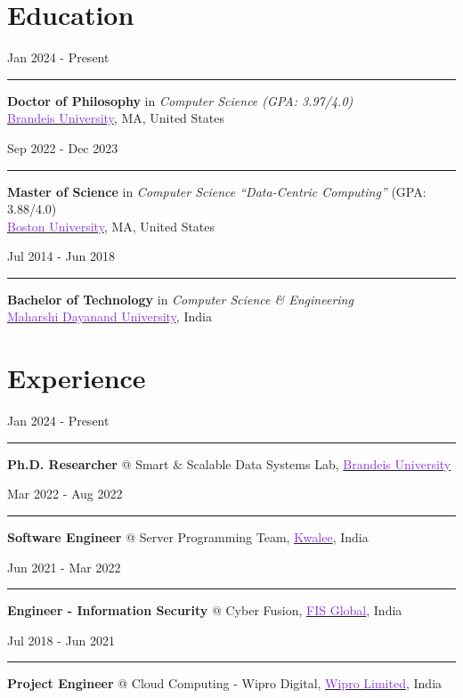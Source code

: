 \documentclass[11pt,a4paper,calibri]{moderncv}
\newcommand{\edu}[2]{
  \noindent
  \begin{minipage}[c]{0.18\textwidth} \hfill #1 \end{minipage}%
  \hspace{0.01\textwidth}
  \begin{minipage}[c]{0.02\textwidth} \textcolor{gray}{\rule{1pt}{0.8cm}} \end{minipage}%
  \begin{minipage}[c]{0.76\textwidth} \raggedright{#2} \end{minipage}%
}
\newcommand{\experience}[2]{
    \noindent
          \begin{minipage}[c]{0.185\textwidth} \begin{flushright} #1 \end{flushright} \end{minipage}%
          \hspace{0.01\textwidth}
          \begin{minipage}[c]{0.02\textwidth} \textcolor{gray}{\rule{1pt}{0.4cm}} \end{minipage}%
          \begin{minipage}[c]{0.755\textwidth} \raggedright{#2} \end{minipage}%
}
\begin{document}
\makecvtitle{}
\vspace{-48pt}

\section{Education}
\edu {Jan 2024 \-- Present}{
    \textbf{Doctor of Philosophy} in \textit{Computer Science (GPA: 3.97/4.0)}\\
    \href{https://www.brandeis.edu/}{\textcolor{blueviolet}{Brandeis University}}, MA, United States
}

\mediumspace{}

\edu{Sep 2022 \-- Dec 2023}
{
	\textbf{Master of Science} in \textit{Computer Science ``Data-Centric Computing''} (GPA: 3.88/4.0)\\
	\href{https://www.bu.edu/}{\textcolor{blueviolet}{Boston University}}, MA, United States
}

\mediumspace{}

\edu{Jul 2014 \-- Jun 2018}
{
	\textbf{Bachelor of Technology} in \textit{Computer Science \& Engineering}\\
	\href{https://mdu.ac.in/}{\textcolor{blueviolet}{Maharshi Dayanand University}}, India
}

\vspace{-1em}
\section{Experience}
\vspace{-0.3em}
\experience{Jan 2024 \-- Present}{
	\textbf{Ph.D. Researcher} @ Smart \& Scalable Data Systems Lab, \href{https://www.brandeis.edu/}{\textcolor{blueviolet}{Brandeis University}}
}
\mediumspace{}

\experience{Mar 2022 \-- Aug 2022}{
	\textbf{Software Engineer} @ Server Programming Team, \href{https://www.kwalee.com/}{\textcolor{blueviolet}{Kwalee}}, India
}
\mediumspace{}

\experience{Jun 2021 \-- Mar 2022}{
	\textbf{Engineer \-- Information Security} @ Cyber Fusion, \href{https://www.fisglobal.com/en}{\textcolor{blueviolet}{FIS Global}}, India
}
\mediumspace{}

\experience{Jul 2018 \-- Jun 2021}{
	\textbf{Project Engineer} @ Cloud Computing - Wipro Digital, \href{https://www.wipro.com/}{\textcolor{blueviolet}{Wipro Limited}}, India
}
\end{document}
